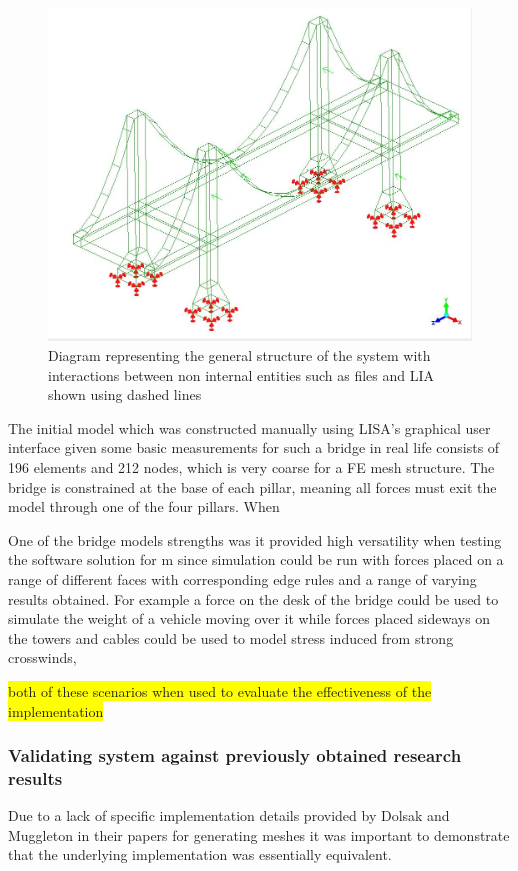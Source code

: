 \documentclass{article}
\begin{document}
\begin{figure}[!h]
  \centerline{\includegraphics[width=150mm, scale=1]{BasicBridge.jpeg}}
  \caption{Diagram representing the general structure of the system with interactions between non internal entities such as files and LIA shown using dashed lines}
  \label{fig:h-refinementImp}
\end{figure}




The initial model which was constructed manually using LISA's graphical user interface given some basic measurements for such a bridge in real \cite{}life consists of 196 elements and 212 nodes, which is very coarse for a FE mesh structure. The bridge is constrained at the base of each pillar, meaning all forces must exit the model through one of the four pillars. When

One of the bridge models strengths was it provided high versatility when testing the software solution for m since simulation could be run with forces placed on a range of different faces with corresponding edge rules and a range of varying results obtained. For example a force on the desk of the bridge could be used to simulate the weight of a vehicle moving over it while forces placed sideways on the towers and cables could be used to model stress induced from strong crosswinds, 

\colorbox{yellow}{both of these scenarios when used to evaluate the effectiveness of the implementation}


\subsubsection{Validating system against previously obtained research results}
Due to a lack of specific implementation details provided by Dolsak and Muggleton in their papers for generating meshes it was important to demonstrate that the underlying implementation was essentially equivalent. 
\end{document}

